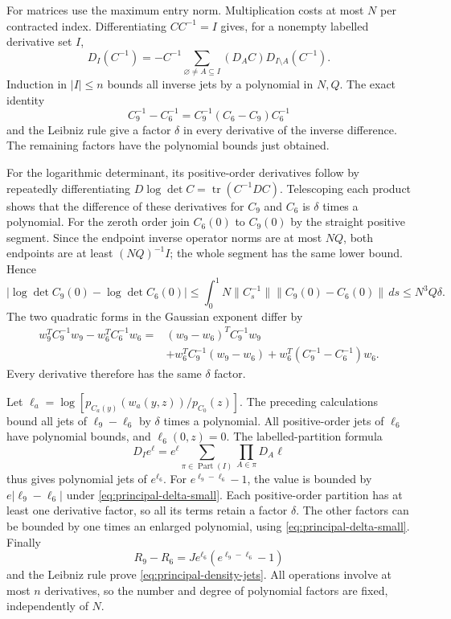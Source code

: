 For matrices use the maximum entry norm. Multiplication costs at
most $N$ per contracted index. Differentiating $CC^{-1}=I$
gives, for a nonempty labelled derivative set $I$,
\[
 D_I(C^{-1})=-C^{-1}
        \sum_{\varnothing\ne A\subseteq I}(D_AC)
                                      D_{I\setminus A}(C^{-1}).
\]
Induction in $|I|\le n$ bounds all inverse jets by a polynomial
in $N,Q$. The exact identity
\[
 C_9^{-1}-C_6^{-1}
                      =C_9^{-1}(C_6-C_9)C_6^{-1}
\]
and the Leibniz rule give a factor $\delta$ in every derivative
of the inverse difference. The remaining factors have the
polynomial bounds just obtained.

For the logarithmic determinant, its positive-order derivatives
follow by repeatedly differentiating
$D\log\det C=\operatorname{tr}(C^{-1}DC)$.
Telescoping each product shows that the difference of these
derivatives for $C_9$ and $C_6$ is $\delta$ times a polynomial.
For the zeroth order join $C_6(0)$ to $C_9(0)$ by the straight
positive segment. Since the endpoint inverse operator norms are
at most $NQ$, both endpoints are at least $(NQ)^{-1}I$;
the whole segment has the same lower bound. Hence
\[
 |\log\det C_9(0)-\log\det C_6(0)|
 \le\int_0^1N\|C_s^{-1}\|\|C_9(0)-C_6(0)\|\,ds
 \le N^3Q\delta.
\]
The two quadratic forms in the Gaussian exponent differ by
\[
\begin{split}
 w_9^TC_9^{-1}w_9-w_6^TC_6^{-1}w_6
  ={}&(w_9-w_6)^TC_9^{-1}w_9\\
     &+w_6^TC_9^{-1}(w_9-w_6)
       +w_6^T(C_9^{-1}-C_6^{-1})w_6.
\end{split}
\]
Every derivative therefore has the same $\delta$ factor.

Let $\ell_a=\log[p_{C_a(y)}(w_a(y,z))/p_{C_0}(z)]$.
The preceding calculations bound all jets of $\ell_9-\ell_6$
by $\delta$ times a polynomial. All positive-order jets of
$\ell_6$ have polynomial bounds, and $\ell_6(0,z)=0$.
The labelled-partition formula
\[
 D_Ie^\ell=e^\ell\sum_{\pi\in\operatorname{Part}(I)}
                                  \prod_{A\in\pi}D_A\ell
\]
thus gives polynomial jets of $e^{\ell_6}$. For
$e^{\ell_9-\ell_6}-1$, the value is bounded by
$e|\ell_9-\ell_6|$ under \eqref{eq:principal-delta-small}.
Each positive-order partition has at least one derivative factor,
so all its terms retain a factor $\delta$. The other factors
can be bounded by one times an enlarged polynomial, using
\eqref{eq:principal-delta-small}. Finally
\[
 R_9-R_6=J e^{\ell_6}(e^{\ell_9-\ell_6}-1)
\]
and the Leibniz rule prove \eqref{eq:principal-density-jets}.
All operations involve at most $n$ derivatives, so the number
and degree of polynomial factors are fixed, independently of $N$.

